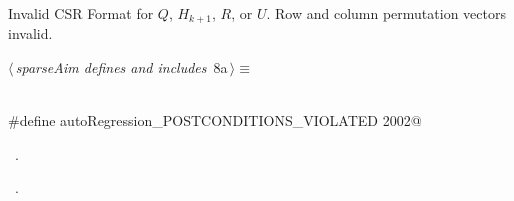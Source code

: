 \documentclass{article}
\begin{document}
\begin{description}
\begin{description}
\begin{flushleft}
\begin{minipage}{\linewidth}
\begin{list}{}{\setlength{\itemsep}{-\parsep}\setlength{\itemindent}{-\leftmargin}}
\item{}
\end{list}
\end{minipage}\vspace{4ex}
\end{flushleft}
\item[{\bf autoRegression\_POSTCONDITIONS\_VIOLATED}] Invalid CSR Format
for $Q$, $H_{k+1}$, $R$, or $U$. Row and column permutation  vectors invalid.
\begin{flushleft} \small
\begin{minipage}{\linewidth}\label{scrap5}\raggedright\small
{} $\langle\,${\itshape sparseAim defines and includes}\nobreak\ {\footnotesize {8a}}$\,\rangle\equiv$
\vspace{-1ex}
\begin{list}{}{} \item
\mbox{}\verb@@\\
\mbox{}\verb@#define autoRegression_POSTCONDITIONS_VIOLATED 2002@\\
\mbox{}\verb@@{\NWsep}
\end{list}
\vspace{-1.5ex}
\footnotesize
\begin{list}{}{\setlength{\itemsep}{-\parsep}\setlength{\itemindent}{-\leftmargin}}
\item \NWtxtMacroDefBy\ .
\item \NWtxtMacroRefIn\ .


\end{list}
\end{minipage}
\end{flushleft}
\end{description}
\end{description}
\end{document}
